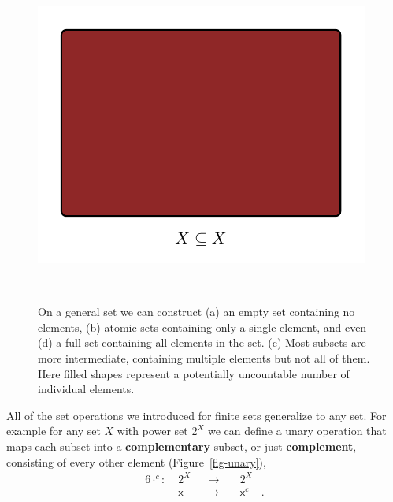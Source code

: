 \documentclass[
  letterpaper,
  DIV=11,
  numbers=noendperiod]{scrartcl}
\begin{document}
\begin{figure}
\begin{minipage}[t]{0.45\linewidth}
{{\includegraphics{figures/sets/examples/full/full.pdf}

}

}

\subcaption{\label{fig-full}}
\end{minipage}%
%
\begin{minipage}[t]{0.05\linewidth}

{\centering 

~

}

\end{minipage}%

\caption{\label{fig-subsets}On a general set we can construct (a) an
empty set containing no elements, (b) atomic sets containing only a
single element, and even (d) a full set containing all elements in the
set. (c) Most subsets are more intermediate, containing multiple
elements but not all of them. Here filled shapes represent a potentially
uncountable number of individual elements.}

\end{figure}

All of the set operations we introduced for finite sets generalize to
any set. For example for any set \(X\) with power set \(2^{X}\) we can
define a unary operation that maps each subset into a
\textbf{complementary} subset, or just \textbf{complement}, consisting
of every other element (Figure~\ref{fig-unary}), \begin{alignat*}{6}
\cdot^c :\; & 2^X & &\rightarrow& \; & 2^X &
\\
& \mathsf{x} & &\mapsto& & \mathsf{x}^{c} &.
\end{alignat*}
\end{document}
